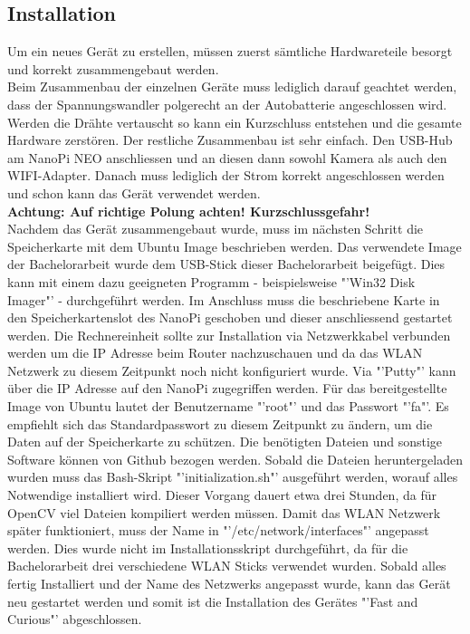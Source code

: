 \subsection{Installation}
Um ein neues Gerät zu erstellen, müssen zuerst sämtliche Hardwareteile besorgt und korrekt zusammengebaut werden.\\

Beim Zusammenbau der einzelnen Geräte muss lediglich darauf geachtet werden, dass der Spannungswandler polgerecht an der Autobatterie angeschlossen wird. Werden die Drähte vertauscht so kann ein Kurzschluss entstehen und die gesamte Hardware zerstören. Der restliche Zusammenbau ist sehr einfach. Den USB-Hub am NanoPi NEO anschliessen und an diesen dann sowohl Kamera als auch den WIFI-Adapter. Danach muss lediglich der Strom korrekt angeschlossen werden und schon kann das Gerät verwendet werden.\\
\textbf{Achtung: Auf richtige Polung achten! Kurzschlussgefahr!}\\

Nachdem das Gerät zusammengebaut wurde, muss im nächsten Schritt die Speicherkarte mit dem Ubuntu Image beschrieben werden. Das verwendete Image der Bachelorarbeit wurde dem USB-Stick dieser Bachelorarbeit beigefügt. Dies kann mit einem dazu geeigneten Programm - beispielsweise "'Win32 Disk Imager"' - durchgeführt werden. Im Anschluss muss die beschriebene Karte in den Speicherkartenslot des NanoPi geschoben und dieser anschliessend gestartet werden. Die Rechnereinheit sollte zur Installation via Netzwerkkabel verbunden werden um die IP Adresse beim Router nachzuschauen und da das WLAN Netzwerk zu diesem Zeitpunkt noch nicht konfiguriert wurde. Via "'Putty"' kann über die IP Adresse auf den NanoPi zugegriffen werden. Für das bereitgestellte Image von Ubuntu lautet der Benutzername "'root"' und das Passwort "'fa"'. Es empfiehlt sich das Standardpasswort zu diesem Zeitpunkt zu ändern, um die Daten auf der Speicherkarte zu schützen. Die benötigten Dateien und sonstige Software können von Github bezogen werden. Sobald die Dateien heruntergeladen wurden muss das Bash-Skript "'initialization.sh"' ausgeführt werden, worauf alles Notwendige installiert wird. Dieser Vorgang dauert etwa drei Stunden, da für OpenCV viel Dateien kompiliert werden müssen.
Damit das WLAN Netzwerk später funktioniert, muss der Name in "'/etc/network/interfaces"' angepasst werden. Dies wurde nicht im Installationsskript durchgeführt, da für die Bachelorarbeit drei verschiedene WLAN Sticks verwendet wurden. Sobald alles fertig Installiert und der Name des Netzwerks angepasst wurde, kann das Gerät neu gestartet werden und somit ist die Installation des Gerätes "'Fast and Curious"' abgeschlossen.